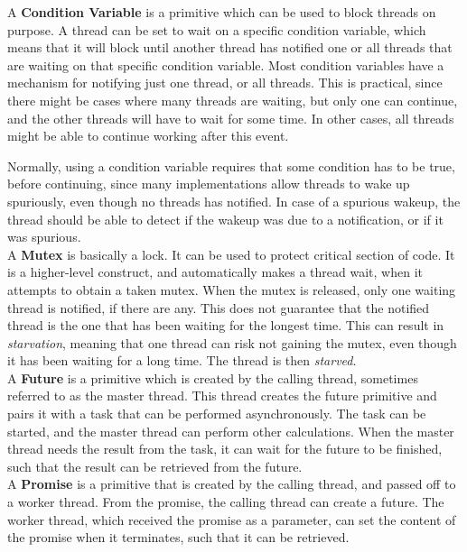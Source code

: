 \documentclass[a4paper]{article}
\begin{document}
A \textbf{Condition Variable} is a primitive which can be used to block threads on purpose. A thread can be set to wait on a specific condition variable, which means that it will block until another thread has notified one or all threads that are waiting on that specific condition variable. Most condition variables have a mechanism for notifying just one thread, or all threads. This is practical, since there might be cases where many threads are waiting, but only one can continue, and the other threads will have to wait for some time. In other cases, all threads might be able to continue working after this event. 

Normally, using a condition variable requires that some condition has to be true, before continuing, since many implementations allow threads to wake up spuriously, even though no threads has notified. In case of a spurious wakeup, the thread should be able to detect if the wakeup was due to a notification, or if it was spurious.\\

A \textbf{Mutex} is basically a lock. It can be used to protect critical section of code. It is a higher-level construct, and automatically makes a thread wait, when it attempts to obtain a taken mutex. When the mutex is released, only one waiting thread is notified, if there are any. This does not guarantee that the notified thread is the one that has been waiting for the longest time. This can result in \textit{starvation}, meaning that one thread can risk not gaining the mutex, even though it has been waiting for a long time. The thread is then \textit{starved}.\\

A \textbf{Future} is a primitive which is created by the calling thread, sometimes referred to as the master thread. This thread creates the future primitive and pairs it with a task that can be performed asynchronously. The task can be started, and the master thread can perform other calculations. When the master thread needs the result from the task, it can wait for the future to be finished, such that the result can be retrieved from the future.\\

A \textbf{Promise} is a primitive that is created by the calling thread, and passed off to a worker thread. From the promise, the calling thread can create a future. The worker thread, which received the promise as a parameter, can set the content of the promise when it terminates, such that it can be retrieved.\\
\end{document}
